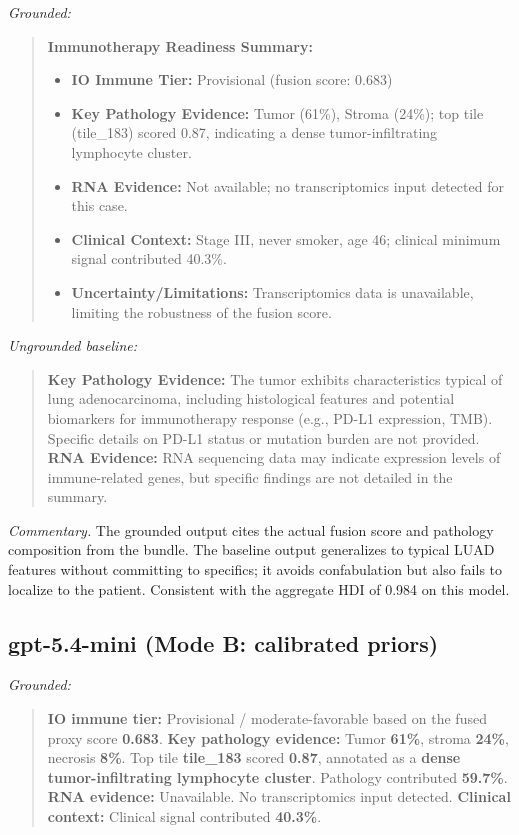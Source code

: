 \documentclass[11pt]{article}
\begin{document}
\noindent\textit{Grounded:}
\begin{quote}\small
\textbf{Immunotherapy Readiness Summary:}
\begin{itemize}
  \item \textbf{IO Immune Tier:} Provisional (fusion score: 0.683)
  \item \textbf{Key Pathology Evidence:} Tumor (61\%), Stroma (24\%); top tile (tile\_183) scored 0.87, indicating a dense tumor-infiltrating lymphocyte cluster.
  \item \textbf{RNA Evidence:} Not available; no transcriptomics input detected for this case.
  \item \textbf{Clinical Context:} Stage III, never smoker, age 46; clinical minimum signal contributed 40.3\%.
  \item \textbf{Uncertainty/Limitations:} Transcriptomics data is unavailable, limiting the robustness of the fusion score.
\end{itemize}
\end{quote}

\noindent\textit{Ungrounded baseline:}
\begin{quote}\small
\textbf{Key Pathology Evidence:} The tumor exhibits characteristics typical of lung adenocarcinoma, including histological features and potential biomarkers for immunotherapy response (e.g., PD-L1 expression, TMB). Specific details on PD-L1 status or mutation burden are not provided. \textbf{RNA Evidence:} RNA sequencing data may indicate expression levels of immune-related genes, but specific findings are not detailed in the summary.
\end{quote}

\emph{Commentary.} The grounded output cites the actual fusion score and pathology composition from the bundle. The baseline output generalizes to typical LUAD features without committing to specifics; it avoids confabulation but also fails to localize to the patient. Consistent with the aggregate HDI of 0.984 on this model.

\subsection{gpt-5.4-mini (Mode B: calibrated priors)}

\noindent\textit{Grounded:}
\begin{quote}\small
\textbf{IO immune tier:} Provisional / moderate-favorable based on the fused proxy score \textbf{0.683}.
\textbf{Key pathology evidence:} Tumor \textbf{61\%}, stroma \textbf{24\%}, necrosis \textbf{8\%}. Top tile \textbf{tile\_183} scored \textbf{0.87}, annotated as a \textbf{dense tumor-infiltrating lymphocyte cluster}. Pathology contributed \textbf{59.7\%}.
\textbf{RNA evidence:} Unavailable. No transcriptomics input detected.
\textbf{Clinical context:} Clinical signal contributed \textbf{40.3\%}.
\end{quote}
\end{document}
